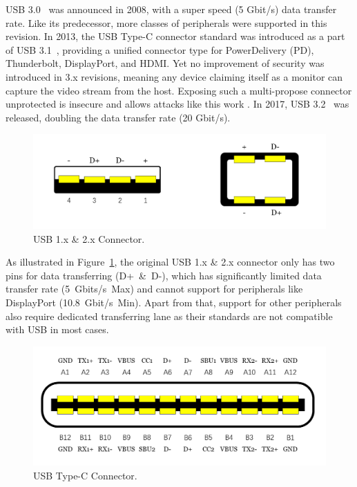 USB 3.0~\cite{usb30} was announced in 2008, with a super speed (5 Gbit/s) data
transfer rate. Like its predecessor, more classes of peripherals were supported
in this revision. In 2013, the USB Type-C connector standard was introduced as a
part of USB 3.1~\cite{usb31}, providing a unified connector type for
PowerDelivery (PD), Thunderbolt, DisplayPort, and HDMI.  Yet no improvement of
security was introduced in 3.x revisions, meaning any device claiming
itself as a monitor can capture the video stream from the host. Exposing
such a multi-propose connector unprotected is insecure and allows attacks like
this work \tool. In 2017, USB 3.2~\cite{usb32} was released, doubling the data
transfer rate (20 Gbit/s).

\begin{figure}[t]
    \centering
	\includegraphics[width=0.7\linewidth]{./Figs/usb_conn.png}
	\caption{USB 1.x \& 2.x Connector.}
	\label{fig:usb_conn}
\end{figure}

As illustrated in Figure~\ref{fig:usb_conn}, the original USB 1.x \& 2.x
connector only has two pins for data transferring \mbox{(D+ \& D-)}, which has
significantly limited data transfer rate \mbox{(5 Gbits/s Max)} and cannot support for
peripherals like DisplayPort \mbox{(10.8 Gbit/s Min)}. Apart from that, support for
other peripherals also require dedicated transferring lane as their standards
are not compatible with USB in most cases.  

\begin{figure}[t] 
	\centering
	\includegraphics[width=\linewidth]{./Figs/usb_c_conn.png} 
	\caption{USB Type-C Connector.} 
	\label{fig:usb_c_conn} 
\end{figure}

